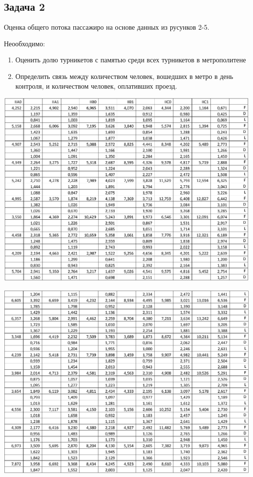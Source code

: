 \documentclass[a4paper, 12pt]{article}   	%
\begin{document}
\subsection{Задача 2}
    Оценка общего потока пассажиро на основе данных из русунков 2-5.
    
    Неообходимо:
    \begin{enumerate}
        \item Оценить долю турникетов с памятью среди всех турникетов в метрополитене
        \item Определить связь между количеством человек, вошедших в метро в день контроля, и количеством человек, оплативших проезд.
    \end{enumerate}
    
    \begin{center}
        \begin{minipage}{0.9\linewidth}
            \includegraphics[width=\linewidth]{img/task_2_0}
        \end{minipage}
    \end{center}
    \begin{center}
        \begin{minipage}{0.9\linewidth}
            \includegraphics[width=\linewidth]{img/task_2_1}
        \end{minipage}
    \end{center}
\end{document}
